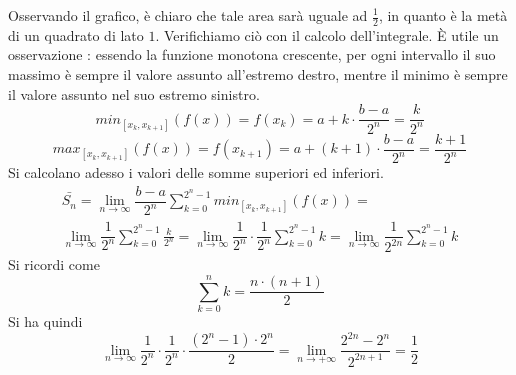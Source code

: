 \documentclass[10pt, letterpaper]{report}
\begin{document}
Osservando il grafico, è chiaro che tale area sarà uguale ad $\frac{1}{2}$, in quanto è la 
metà di un quadrato di lato $1$. Verifichiamo ciò con il calcolo dell'integrale.
È utile un osservazione : essendo la funzione monotona crescente, per ogni intervallo il suo 
massimo è sempre il valore assunto all'estremo destro, mentre il minimo è sempre il valore 
assunto nel suo estremo sinistro.
$$ min_{[x_k,x_{k+1}]}(f(x))=f(x_k)=a+k\cdot \frac{b-a}{2^n}=\frac{k}{2^n}$$
$$max_{[x_k,x_{k+1}]}(f(x))=f(x_{k+1})=a+(k+1)\cdot \frac{b-a}{2^n}=\frac{k+1}{2^n}$$
Si calcolano adesso i valori delle somme superiori ed inferiori.
$$\begin{matrix}
    \displaystyle\bar{S_n}=\lim_{n\rightarrow \infty}\dfrac{b-a}{2^n}\sum_{k=0}^{2^n-1}min_{[x_k,x_{k+1}]}(f(x)) = \\
    \displaystyle 
    \lim_{n\rightarrow \infty}\dfrac{1}{2^n}\sum_{k=0}^{2^n-1}\frac{k}{2^n} = 
    \lim_{n\rightarrow \infty}\dfrac{1}{2^n}\cdot \dfrac{1}{2^n}\sum_{k=0}^{2^n-1}k 
    = \lim_{n\rightarrow \infty}\dfrac{1}{2^{2n}}\sum_{k=0}^{2^n-1}k
\end{matrix}$$
Si ricordi come 
$$ \displaystyle \sum^n_{k=0}k=\frac{n\cdot(n+1)}{2}$$
Si ha quindi 
$$  \lim_{n\rightarrow \infty}\dfrac{1}{2^n}\cdot \dfrac{1}{2^n}\cdot \dfrac{(2^n-1)\cdot2^n}{2}
=\lim_{n\rightarrow +\infty}\frac{2^{2n}-2^n}{2^{2n+1}}=\frac{1}{2}$$
\end{document}
